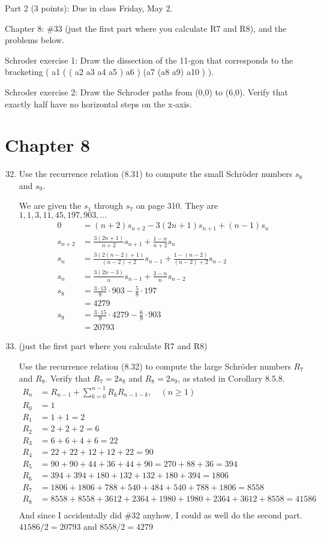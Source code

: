 \documentclass{article}
\begin{document}
Part 2 (3 points): Due in class Friday, May 2.

Chapter 8: \#33 (just the first part where you calculate R7 and R8), and the problems below.

Schroder exercise 1: Draw the dissection of the 11-gon that corresponds to the bracketing ( a1 ( ( a2 a3 a4 a5 ) a6 ) (a7 (a8 a9) a10 ) ).

Schroder exercise 2: Draw the Schroder paths from (0,0) to (6,0). Verify that exactly half have no horizontal steps on the x-axis.
\section*{Chapter 8}
\begin{enumerate}
\setcounter{enumi}{31}
  \item
  Use the recurrence relation (8.31) to compute the small Schr\"{o}der numbers $s_8$ and $s_9$.

  We are given the $s_1$ through $s_7$ on page 310. They are $1,1,3,11,45,197,903,\dots$
  \begin{align*}
    0&=(n+2)s_{n+2}-3(2n+1)s_{n+1}+(n-1)s_n\\
    s_{n+2}&=\frac{3(2n+1)}{n+2}s_{n+1}+\frac{1-n}{n+2}s_n\\
    s_{n}&=\frac{3(2(n-2)+1)}{(n-2)+2}s_{n-1}+\frac{1-(n-2)}{(n-2)+2}s_{n-2}\\
    s_{n}&=\frac{3(2n-3)}{n}s_{n-1}+\frac{3-n}{n}s_{n-2}\\
    s_8&=\frac{3\cdot13}{8}\cdot903-\frac{5}{8}\cdot197\\
    &=4279\\
    s_9&=\frac{3\cdot15}{9}\cdot4279-\frac{6}{9}\cdot903\\
    &=20793
  \end{align*}

  \item
  (just the first part where you calculate R7 and R8)

  Use the recurrence relation (8.32) to compute the large Schr\"{o}der numbers $R_7$ and $R_8$. Verify that $R_7=2s_8$ and $R_8=2s_9$, as stated in Corollary 8.5.8.
\begin{align*}
  R_n&=R_{n-1}+\sum\limits_{k=0}^{n-1}{R_kR_{n-1-k}},\quad(n\ge1)\\
  R_0&=1\\
  R_1&=1+1=2\\
  R_2&=2+2+2=6\\
  R_3&=6+6+4+6=22\\
  R_4&=22+22+12+12+22=90\\
  R_5&=90+90+44+36+44+90=270+88+36=394\\
  R_6&=394+394+180+132+132+180+394=1806\\
  R_7&=1806+1806+788+540+484+540+788+1806=8558\\
  R_8&=8558+8558+3612+2364+1980+1980+2364+3612+8558=41586\\
\end{align*}
And since I accidentally did \#32 anyhow, I could as well do the second part. $41586/2=20793$ and $8558/2=4279$
\end{enumerate}
\end{document}
